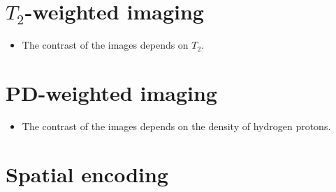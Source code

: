 \section{$T_2$-weighted imaging}
\begin{itemize}
\item The contrast of the images depends on $T_2$.
\end{itemize}

\section{PD-weighted imaging}
\begin{itemize}
\item The contrast of the images depends on the density of hydrogen
  protons.
\end{itemize}

\section{Spatial encoding}
\label{sec:spatial_encoding}

